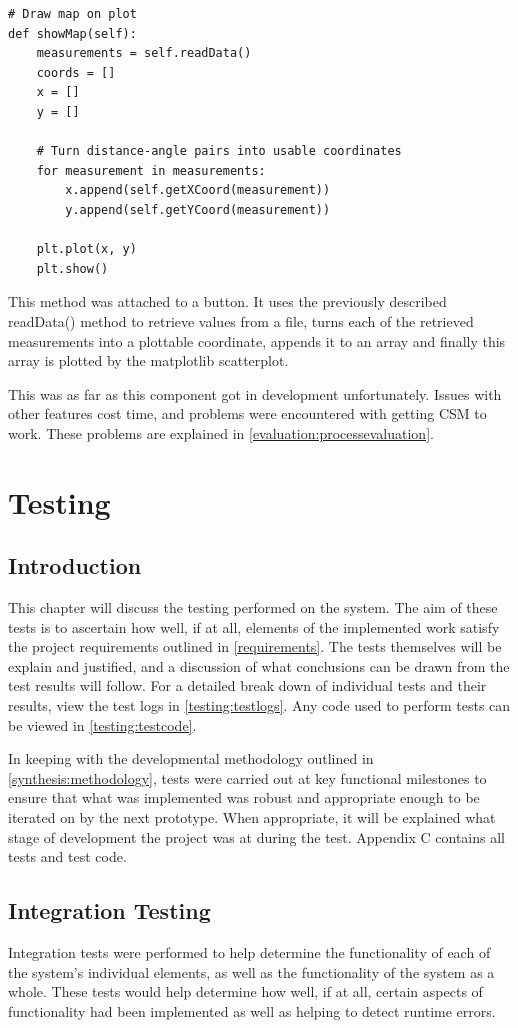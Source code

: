 				\begin{lstlisting}
# Draw map on plot
def showMap(self):
	measurements = self.readData()
	coords = []
	x = []
	y = []
						
	# Turn distance-angle pairs into usable coordinates
	for measurement in measurements:
		x.append(self.getXCoord(measurement))
		y.append(self.getYCoord(measurement))
				
	plt.plot(x, y)
	plt.show()
				\end{lstlisting}
				This method was attached to a button. It uses the previously described readData() method to retrieve values from a file, turns each of the retrieved measurements into a plottable coordinate, appends it to an array and finally this array is plotted by the matplotlib scatterplot.
				
				This was as far as this component got in development unfortunately. Issues with other features cost time, and problems were encountered with getting CSM to work. These problems are explained in \ref{evaluation:processevaluation}.
				
	
	\chapter{Testing}
		\section{Introduction}
		This chapter will discuss the testing performed on the system. The aim of these tests is to ascertain how well, if at all, elements of the implemented work satisfy the project requirements outlined in \ref{requirements}. The tests themselves will be explain and justified, and a discussion of what conclusions can be drawn from the test results will follow. For a detailed break down of individual tests and their results, view the test logs in \ref{testing:testlogs}. Any code used to perform tests can be viewed in \ref{testing:testcode}.
		
		In keeping with the developmental methodology outlined in \ref{synthesis:methodology}, tests were carried out at key functional milestones to ensure that what was implemented was robust and appropriate enough to be iterated on by the next prototype. When appropriate, it will be explained what stage of development the project was at during the test. Appendix C contains all tests and test code.
		
		
		\section{Integration Testing}
		Integration tests were performed to help determine the functionality of each of the system's individual elements, as well as the functionality of the system as a whole. These tests would help determine how well, if at all, certain aspects of functionality had been implemented as well as helping to detect runtime errors.
		

